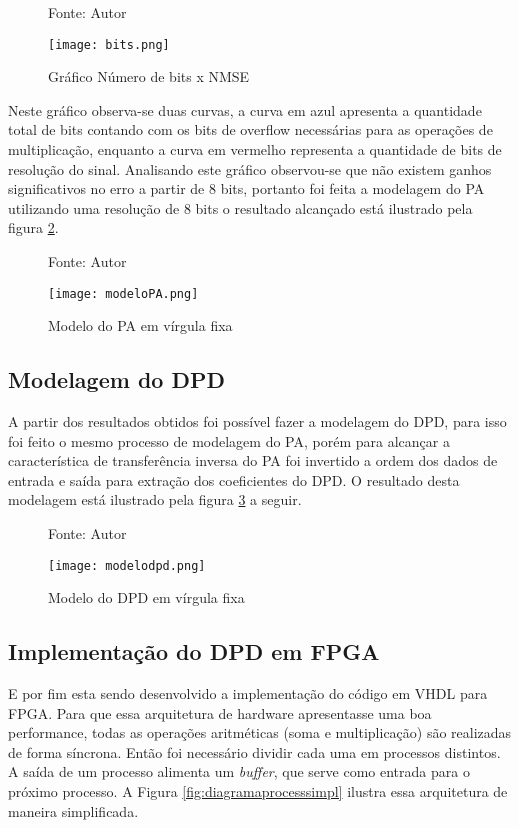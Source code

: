 \begin{figure}[H]
    \centering
    \captionsetup{justification=centering}
    \caption*{Fonte: Autor}
    \texttt{[image: bits.png]}
    \caption{Gráfico Número de bits x NMSE}
    \label{fig:bits}
\end{figure}

Neste gráfico observa-se duas curvas, a curva em azul apresenta a quantidade total de bits contando com os bits de overflow necessárias para as operações de multiplicação, enquanto a curva em vermelho representa a quantidade de bits de resolução do sinal. Analisando este gráfico observou-se que não existem ganhos significativos no erro a partir de 8 bits, portanto foi feita a modelagem do PA utilizando uma resolução de 8 bits o resultado alcançado está ilustrado pela figura \ref{fig:modelopa}.

\begin{figure}[H]
    \centering
    \captionsetup{justification=centering}
    \caption*{Fonte: Autor}
    \texttt{[image: modeloPA.png]}
    \caption{Modelo do PA em vírgula fixa}
    \label{fig:modelopa}
\end{figure}

\subsection{Modelagem do DPD}
A partir dos resultados obtidos foi possível fazer a modelagem do DPD, para isso foi feito o mesmo processo de modelagem do PA, porém para alcançar a característica de transferência inversa do PA foi invertido a ordem dos dados de entrada e saída para extração dos coeficientes do DPD. O resultado desta modelagem está ilustrado pela figura \ref{fig:modelodpd} a seguir.

\begin{figure}[H]
    \centering
    \captionsetup{justification=centering}
    \caption*{Fonte: Autor}
    \texttt{[image: modelodpd.png]}
    \caption{Modelo do DPD em vírgula fixa}
    \label{fig:modelodpd}
\end{figure}

\subsection{Implementação do DPD em FPGA}

E por fim esta sendo desenvolvido a implementação do código em VHDL para FPGA.
Para que essa arquitetura de hardware apresentasse uma boa performance, todas as operações aritméticas (soma e multiplicação) são realizadas de forma síncrona. Então foi necessário dividir cada uma em processos distintos. A saída de um processo alimenta um \textit{buffer}, que serve como entrada para o próximo processo. A Figura \ref{fig:diagramaprocesssimpl} ilustra essa arquitetura de maneira simplificada.

